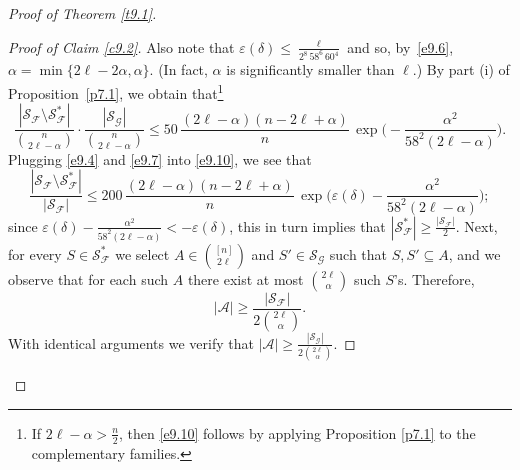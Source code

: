 \documentclass[10pt,a4paper]{amsart}
\theoremstyle{remark}
\newcommand{\ee}{\varepsilon}
\newcommand{\meg}{\geqslant}
\newcommand{\mik}{\leqslant}
\newcommand{\Fcal}{\mathcal{F}}
\newcommand{\Gcal}{\mathcal{G}}
\newcommand{\Scal}{\mathcal{S}}
\newcommand{\Acal}{\mathcal{A}}
\begin{document}
\begin{proof}[Proof of Theorem \emph{\ref{t9.1}}]
\begin{proof}[Proof of Claim \emph{\ref{c9.2}}]
Also note that $\varepsilon(\delta)\mik \frac{\ell}{2^{8}\, 58^6\, 60^4}$ and so, by~\eqref{e9.6},
$\alpha=\min\{2\ell-2\alpha,\alpha\}$. (In fact, $\alpha$ is significantly smaller than $\ell$.)
By part (i) of Proposition~\ref{p7.1}, we obtain
that\footnote{If $2\ell-\alpha> \frac{n}{2}$, then \eqref{e9.10} follows by applying
Proposition \ref{p7.1} to the complementary families.}
\begin{equation} \label{e9.10}
\frac{|\Scal_{\Fcal}\setminus\Scal^*_{\Fcal}|}{\binom{n}{2\ell-\alpha}}\cdot
\frac{|\Scal_{\Gcal}|}{\binom{n}{2\ell-\alpha}} \mik 50\,
\frac{(2\ell-\alpha)(n-2\ell+\alpha)}{n}\, \exp\Big(-\frac{\alpha^2}{58^2(2\ell-\alpha)}\Big).
\end{equation}
Plugging \eqref{e9.4} and \eqref{e9.7} into \eqref{e9.10}, we see that
\begin{equation} \label{e9.11}
\frac{|\Scal_{\Fcal}\setminus \Scal^*_{\Fcal}|}{|\Scal_{\Fcal}|} \mik
200\, \frac{(2\ell-\alpha)(n-2\ell+\alpha)}{n}\,
\exp\Big(\ee(\delta)-\frac{\alpha^2}{58^2(2\ell-\alpha)}\Big);
\end{equation}
since $\ee(\delta)-\frac{\alpha^2}{58^2(2\ell-\alpha)}<-\ee(\delta)$, this in turn implies that
$|\Scal^*_{\Fcal}|\meg \frac{|\Scal_{\Fcal}|}{2}$. Next, for every $S\in\Scal^*_{\Fcal}$ we select
$A\in\binom{[n]}{2\ell}$ and $S'\in\Scal_{\Gcal}$ such that $S,S'\subseteq A$, and
we observe that for each such $A$ there exist at most $\binom{2\ell}{\alpha}$ such $S$'s. Therefore,
\begin{equation} \label{e9.12}
|\Acal| \meg \frac{|\Scal_{\Fcal}|}{2\binom{2\ell}{\alpha}}.
\end{equation}
With identical arguments we verify that $|\Acal| \meg \frac{|\Scal_{\Gcal}|}{2\binom{2\ell}{\alpha}}$.

\end{proof}
\end{proof}
\end{document}
